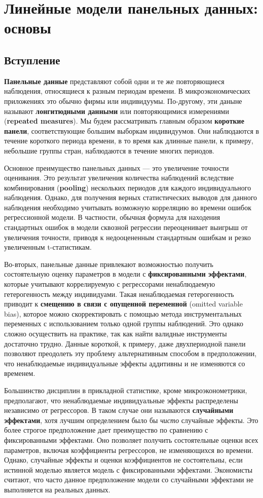 \chapter{Линейные модели панельных данных: основы}
\section{Вступление}
\textbf{Панельные данные} представляют собой одни и те же повторяющиеся наблюдения, относящиеся к разным периодам времени. В микроэкономических приложениях это обычно фирмы или индивидуумы. По-другому, эти даныне называют \textbf{лонгитюдными данными} или повторяющимися измерениями (\textbf{repeated measures}). Мы будем рассматривать главным образом \textbf{короткие панели}, соответствующие большим выборкам индивидуумов. Они наблюдаются в течение короткого периода времени, в то время как длинные панели, к примеру, небольшие группы стран, наблюдаются в течение многих периодов.

Основное преимущество панельных данных  --- это увеличение точности оценивания. Это результат увеличения количества наблюдений вследствие комбинирования (\textbf{pooling}) нескольких периодов для каждого индивидуального наблюдения. Однако, для получения верных статистических выводов для данного наблюдения необходимо учитывать возможную корреляцию во времени ошибок регрессионной модели. В частности, обычная формула для находения стандартных ошибок в модели сквозной регрессии переоценивает выигрыш от увеличения точности, приводя к недооцененным стандартным ошибкам и  резко увеличенным t-статистикам.

Во-вторых, панельные данные привлекают возможностью получить состоятельную оценку параметров в модели с \textbf{фиксированными эффектами}, которые учитывают коррелируемую с регрессорами ненаблюдаемую гетерогенность между индивидуами. Такая ненаблюдаемая гетерогенность приводит к \textbf{смещению в связи с опущенной переменной} (omitted variable bias), которое можно скорректировать с помощью метода инструментальных переменных с использованием только одной группы наблюдений. Это однако сложно осуществить на практике, так как найти валидные инструменты достаточно трудно. Данные короткой, к примеру, даже двухпериодной панели позволяют преодолеть эту проблему альтернативным способом в предположении, что ненаблюдаемые индивидуальные эффекты аддитивны и не изменяются со временем.

Большинство дисциплин в прикладной статистике, кроме микроэконометрики, предполагают, что ненаблюдаемые индивидуальные эффекты распределены независимо от регрессоров. В таком случае они называются \textbf{случайными эффектами}, хотя лучшим определением было бы {\it чисто} случайные эффекты. Это более строгое предположение дает преимущество  по сравнению с фиксированными эффектами. Оно позволяет получить состоятельные оценки всех параметров, включая коэффициенты регрессоров, не изменяющихся во времени. Однако, случайные эффекты и оценки коэффициентов не состоятельны, если истинной моделью является модель с фиксированными эффектами. Экономисты считают, что часто данное предположение модели со случайными эффектами не выполняется на реальных данных.

